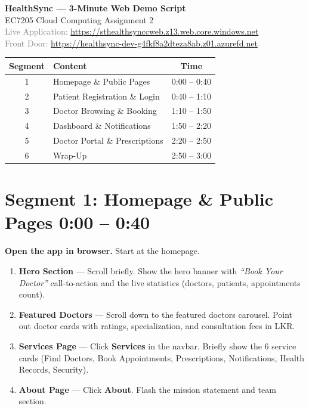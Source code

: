 \documentclass[11pt,a4paper]{article}
\begin{document}
\begin{center}
{\LARGE\bfseries\textcolor{dark}{HealthSync --- 3-Minute Web Demo Script}}\\[6pt]
{\large EC7205 Cloud Computing Assignment 2}\\[4pt]
{\normalsize\textcolor{gray}{Live Application: \url{https://sthealthsynccweb.z13.web.core.windows.net}}}\\[2pt]
{\normalsize\textcolor{gray}{Front Door: \url{https://healthsync-dev-g4fkf8a2dteza8ab.z01.azurefd.net}}}
\end{center}

\vspace{8pt}

\begin{center}
\begin{tabularx}{\textwidth}{|c|X|c|}
\hline
\textbf{\textcolor{dark}{Segment}} & \textbf{\textcolor{dark}{Content}} & \textbf{\textcolor{timecolor}{Time}} \\
\hline
1 & Homepage \& Public Pages & 0:00 -- 0:40 \\
2 & Patient Registration \& Login & 0:40 -- 1:10 \\
3 & Doctor Browsing \& Booking & 1:10 -- 1:50 \\
4 & Dashboard \& Notifications & 1:50 -- 2:20 \\
5 & Doctor Portal \& Prescriptions & 2:20 -- 2:50 \\
6 & Wrap-Up & 2:50 -- 3:00 \\
\hline
\end{tabularx}
\end{center}

\vspace{6pt}

\section{Segment 1: Homepage \& Public Pages \hfill \textcolor{timecolor}{\normalsize 0:00 -- 0:40}}

\textbf{Open the app in browser.} Start at the homepage.

\begin{enumerate}[leftmargin=1.5em, label=\textbf{\arabic*.}]
  \item \textbf{Hero Section} --- Scroll briefly. Show the hero banner with \textit{``Book Your Doctor''} call-to-action and the live statistics (doctors, patients, appointments count).
  \item \textbf{Featured Doctors} --- Scroll down to the featured doctors carousel. Point out doctor cards with ratings, specialization, and consultation fees in LKR.
  \item \textbf{Services Page} --- Click \textbf{Services} in the navbar. Briefly show the 6 service cards (Find Doctors, Book Appointments, Prescriptions, Notifications, Health Records, Security).
  \item \textbf{About Page} --- Click \textbf{About}. Flash the mission statement and team section.
\end{enumerate}
\end{document}
